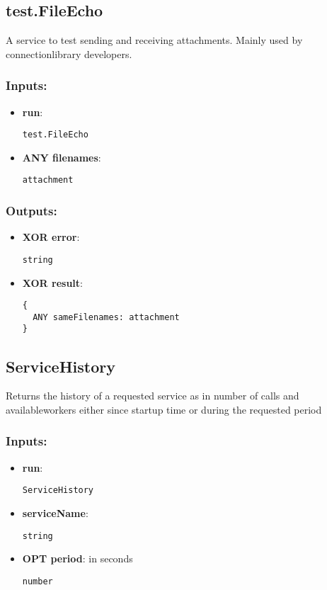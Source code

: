 \subsection{test.FileEcho}
\label{ch:builtinservices:test.FileEcho}
A service to test sending and receiving attachments. Mainly used by connectionlibrary developers.
\subsubsection*{Inputs:}
\begin{itemize}
    \item \textbf{run}: 
\begin{lstlisting}
test.FileEcho
\end{lstlisting}
    \item \textbf{ANY filenames}: 
\begin{lstlisting}
attachment
\end{lstlisting}
  \end{itemize}

\subsubsection*{Outputs:}
\begin{itemize}
    \item \textbf{XOR error}: 
\begin{lstlisting}
string
\end{lstlisting}
    \item \textbf{XOR result}: 
\begin{lstlisting}
{
  ANY sameFilenames: attachment
}
\end{lstlisting}
  \end{itemize}

\subsection{ServiceHistory}
\label{ch:builtinservices:ServiceHistory}
Returns
 the history of a requested service as in number of calls and 
availableworkers either since startup time or during the requested 
period
\subsubsection*{Inputs:}
\begin{itemize}
    \item \textbf{run}: 
\begin{lstlisting}
ServiceHistory
\end{lstlisting}
    \item \textbf{serviceName}: 
\begin{lstlisting}
string
\end{lstlisting}
    \item \textbf{OPT period}: in seconds
\begin{lstlisting}
number
\end{lstlisting}
  \end{itemize}

